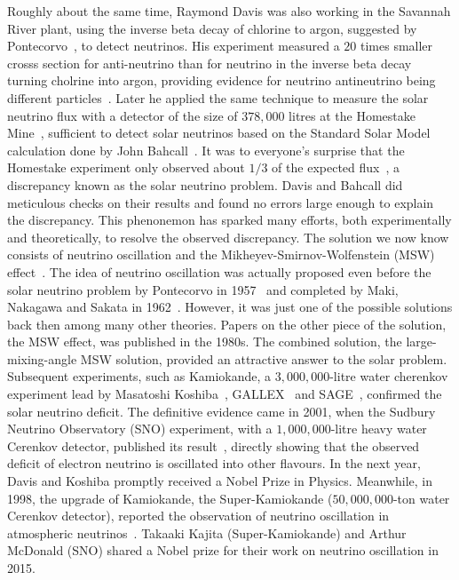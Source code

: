 Roughly about the same time, Raymond Davis was also working in the Savannah River plant, using the inverse beta decay of chlorine to argon, suggested by Pontecorvo~\cite{Pontecorvo:1946mv}, to detect neutrinos.
His experiment measured a $20$ times smaller crosss section for anti-neutrino than for neutrino in the inverse beta decay turning cholrine into argon, providing evidence for neutrino antineutrino being different particles~\cite{Davis:1959pba}.
Later he applied the same technique to measure the solar neutrino flux with a detector of the size of $378,000$ litres at the Homestake Mine~\cite{Davis:1964zz}, sufficient to detect solar neutrinos based on the Standard Solar Model calculation done by John Bahcall~\cite{Bahcall:1964ya}. 
It was to everyone's surprise that the Homestake experiment only observed about $1/3$ of the expected flux~\cite{Davis:1968}, a discrepancy known as the solar neutrino problem.
Davis and Bahcall did meticulous checks on their results and found no errors large enough to explain the discrepancy.
This phenonemon has sparked many efforts, both experimentally and theoretically, to resolve the observed discrepancy.
The solution we now know consists of neutrino oscillation and the Mikheyev-Smirnov-Wolfenstein (MSW) effect~\cite{Wolfenstein:1977ue,Mikheyev:1985zog}.
The idea of neutrino oscillation was actually proposed even before the solar neutrino problem by Pontecorvo in 1957~\cite{Pontecorvo:1957qd} and completed by Maki, Nakagawa and Sakata in 1962~\cite{Maki:1962mu}.
However, it was just one of the possible solutions back then among many other theories.
Papers on the other piece of the solution, the MSW effect, was published in the 1980s.
The combined solution, the large-mixing-angle MSW solution, provided an attractive answer to the solar problem.
Subsequent experiments, such as Kamiokande, a $3,000,000$-litre water cherenkov experiment lead by Masatoshi Koshiba~\cite{Kamiokande-II:1989hkh}, GALLEX~\cite{GALLEX:1998kcz} and SAGE~\cite{SAGE:1999nng}, confirmed the solar neutrino deficit.
The definitive evidence came in 2001, when the Sudbury Neutrino Observatory (SNO) experiment, with a $1,000,000$-litre heavy water Cerenkov detector, published its result~\cite{SNO:2001kpb}, directly showing that the observed deficit of electron neutrino is oscillated into other flavours.
In the next year, Davis and Koshiba promptly received a Nobel Prize in Physics.
Meanwhile, in 1998, the upgrade of Kamiokande, the Super-Kamiokande ($50,000,000$-ton water Cerenkov detector), reported the observation of neutrino oscillation in atmospheric neutrinos~\cite{Super-Kamiokande:1998kpq}.
Takaaki Kajita (Super-Kamiokande) and Arthur McDonald (SNO) shared a Nobel prize for their work on neutrino oscillation in 2015.

